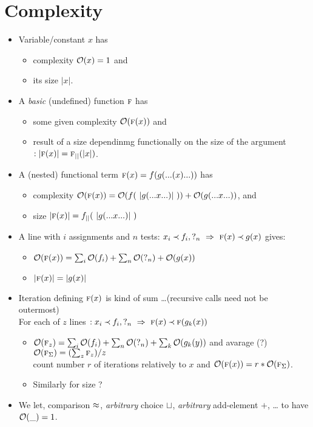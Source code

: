 \documentclass[leqno]{article}
\newcommand{\func}[1]{\mbox{\sc #1}}
\newcommand{\f}[1]{\func{#1}}
\newcommand{\sz}[1]{|#1|} %
\newenvironment{itez}{\begin{itemize}\MyLPar}{\end{itemize}}
\begin{document}
\newpage
\section{Complexity}
%
\begin{itez}
\item
Variable/constant $x$ has 
 \begin{itez} \item complexity ${\cal O}(x)=1$ and \item its size $\sz x$.\end{itez}
\item
A {\em basic} (undefined) function $\f f$ %
has 
 \begin{itez}
  \item some given complexity $\cp(\f f(x))$ and 
  \item result of a size dependinmg
    functionally on the size of the argument $:\sz{\f f(x)}=\f f_{\sz{}}(\sz x)$.
  \end{itez}
\item
A (nested) functional term $\f f(x)= f( g(...(x)...))$ has 
\begin{itez}
 \item complexity $\cp(\f f(x))=\cp(f(\ \sz{g(...x...)}\ )) + \cp(g(...x...))$, and
 \item size $\sz{\f f(x)} = f_{\sz{}}(\ \sz{g(...x...)}\ )$
 \end{itez}
\item A line with $i$ assignments and $n$ tests: 
 $x_i\Incl f_i, \mbox{?}_n\ \impl\ \f f(x)\Incl g(x)$ gives:
 \begin{itez}
  \item $\cp(\f f(x)) = \sum_i\cp(f_i) + \sum_n\cp(\mbox{?}_n) + \cp(g(x))$
  \item $\sz{\f f(x)} = \sz{g(x)}$
 \end{itez}
\item Iteration defining  $\f f(x)$ is kind of sum
  \ldots (recursive calls need not be outermost)\\
For each of $z$ lines $:x_i\Incl f_i, \mbox{?}_n\ \impl\ \f f(x)\Incl \f f(g_k(x))$ 
 \begin{itez}
  \item $\cp(\f f_z) = \sum_i\cp(f_i) + \sum_n\cp(\mbox{?}_n) + \sum_k\cp(g_k(y))$ and
 avarage (?) $\cp(\f f_\Sigma)=(\sum_z \f f_z)/z$ \\
 count number $r$ of iterations relatively to $x$ and $\cp(\f f(x))=r*\cp(\f f_\Sigma)$.
 \item Similarly for size ?
 \end{itez}
\item We let, comparison $\mathbin{\approx}$, {\em arbitrary} choice $\sqcup$, {\em arbitrary} 
   add-element $+$, \ldots 
to have ${\cal O}(\_)=1$. \\[1ex]
\end{itez}
\end{document}

